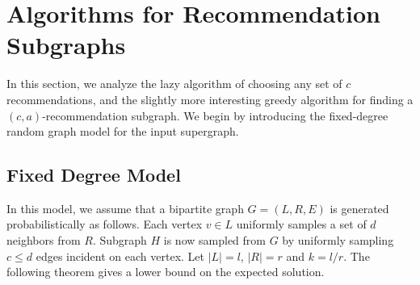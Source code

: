 \section{Algorithms for Recommendation Subgraphs}
In this section, we analyze the lazy algorithm of choosing any set of
$c$ recommendations, and the slightly more interesting greedy algorithm
for finding a $(c,a)$-recommendation subgraph. We begin by introducing
the fixed-degree random graph model for the input supergraph.


\subsection{Fixed Degree Model}
\label{fixed-degree}

 In this model, we assume that a bipartite graph $G=(L,R,E)$ is
generated probabilistically as follows. Each vertex $v\in L$
uniformly samples a set of $d$ neighbors from $R$. Subgraph $H$
is now sampled from $G$ by uniformly sampling $c\leq d$ edges incident
on each vertex. Let $|L|=l$, $|R|=r$ and $k=l/r$. 
The following theorem gives a lower bound on the expected solution.





